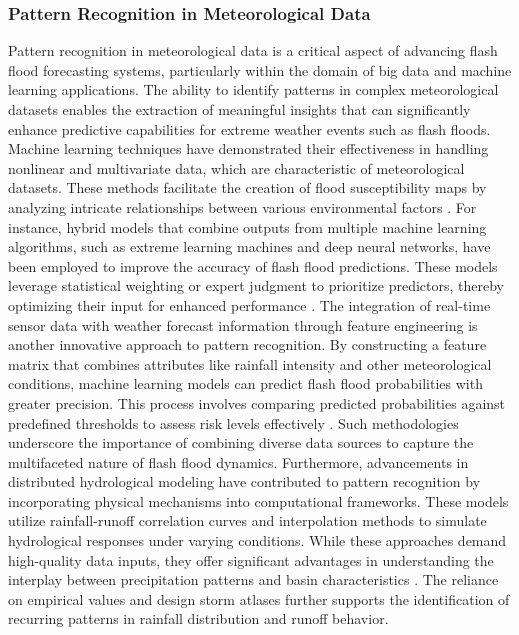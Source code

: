 \subsubsection{Pattern Recognition in Meteorological Data}
Pattern recognition in meteorological data is a critical aspect of advancing flash flood forecasting systems, particularly within the domain of big data and machine learning applications. The ability to identify patterns in complex meteorological datasets enables the extraction of meaningful insights that can significantly enhance predictive capabilities for extreme weather events such as flash floods. Machine learning techniques have demonstrated their effectiveness in handling nonlinear and multivariate data, which are characteristic of meteorological datasets. These methods facilitate the creation of flood susceptibility maps by analyzing intricate relationships between various environmental factors \citep{Ngo2018}.
For instance, hybrid models that combine outputs from multiple machine learning algorithms, such as extreme learning machines and deep neural networks, have been employed to improve the accuracy of flash flood predictions. These models leverage statistical weighting or expert judgment to prioritize predictors, thereby optimizing their input for enhanced performance \citep{Hinge2024}.
The integration of real-time sensor data with weather forecast information through feature engineering is another innovative approach to pattern recognition. By constructing a feature matrix that combines attributes like rainfall intensity and other meteorological conditions, machine learning models can predict flash flood probabilities with greater precision. This process involves comparing predicted probabilities against predefined thresholds to assess risk levels effectively \citep{Msigwa2024}. Such methodologies underscore the importance of combining diverse data sources to capture the multifaceted nature of flash flood dynamics.
Furthermore, advancements in distributed hydrological modeling have contributed to pattern recognition by incorporating physical mechanisms into computational frameworks. These models utilize rainfall-runoff correlation curves and interpolation methods to simulate hydrological responses under varying conditions. While these approaches demand high-quality data inputs, they offer significant advantages in understanding the interplay between precipitation patterns and basin characteristics \citep{Liu2018}. The reliance on empirical values and design storm atlases further supports the identification of recurring patterns in rainfall distribution and runoff behavior.
